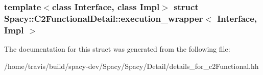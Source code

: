 \subsubsection*{template$<$class Interface, class Impl$>$ struct Spacy\-::\-C2\-Functional\-Detail\-::execution\-\_\-wrapper$<$ Interface, Impl $>$}



\-The documentation for this struct was generated from the following file\-:\begin{DoxyCompactItemize}
\item 
/home/travis/build/spacy-\/dev/\-Spacy/\-Spacy/\-Detail/details\-\_\-for\-\_\-c2\-Functional.\-hh\end{DoxyCompactItemize}
